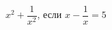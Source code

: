 \begin{ex}[type=calculate_expression]
	\begin{condition}
		\( x^2+\dfrac{1}{x^2} \), \quad если \( x-\dfrac{1}{x}=5 \)
	\end{condition}
\end{ex}